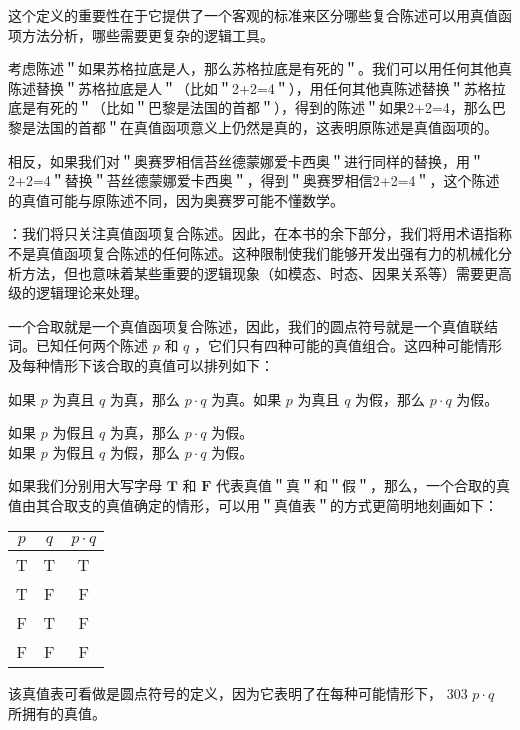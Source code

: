 这个定义的重要性在于它提供了一个客观的标准来区分哪些复合陈述可以用真值函项方法分析，哪些需要更复杂的逻辑工具。

\begin{examplebox}[title=真值函项性的检验方法]
考虑陈述＂如果苏格拉底是人，那么苏格拉底是有死的＂。我们可以用任何其他真陈述替换＂苏格拉底是人＂（比如＂2+2=4＂），用任何其他真陈述替换＂苏格拉底是有死的＂（比如＂巴黎是法国的首都＂），得到的陈述＂如果2+2=4，那么巴黎是法国的首都＂在真值函项意义上仍然是真的，这表明原陈述是真值函项的。

相反，如果我们对＂奥赛罗相信苔丝德蒙娜爱卡西奥＂进行同样的替换，用＂2+2=4＂替换＂苔丝德蒙娜爱卡西奥＂，得到＂奥赛罗相信2+2=4＂，这个陈述的真值可能与原陈述不同，因为奥赛罗可能不懂数学。
\end{examplebox}

：我们将只关注真值函项复合陈述。因此，在本书的余下部分，我们将用术语指称不是真值函项复合陈述的任何陈述。这种限制使我们能够开发出强有力的机械化分析方法，但也意味着某些重要的逻辑现象（如模态、时态、因果关系等）需要更高级的逻辑理论来处理。

一个合取就是一个真值函项复合陈述，因此，我们的圆点符号就是一个真值联结词。已知任何两个陈述 $p$ 和 $q$ ，它们只有四种可能的真值组合。这四种可能情形及每种情形下该合取的真值可以排列如下：

如果 $p$ 为真且 $q$ 为真，那么 $p \cdot q$ 为真。如果 $p$ 为真且 $q$ 为假，那么 $p \cdot q$ 为假。

如果 $p$ 为假且 $q$ 为真，那么 $p \cdot q$ 为假。\\
如果 $p$ 为假且 $q$ 为假，那么 $p \cdot q$ 为假。

如果我们分别用大写字母 $\mathbf{T}$ 和 $\mathbf{F}$ 代表真值＂真＂和＂假＂，那么，一个合取的真值由其合取支的真值确定的情形，可以用＂真值表＂的方式更简明地刻画如下：

\begin{center}
\begin{tabular}{|ccc|}
\hline
$p$ & $q$ & $p \cdot q$ \\
\hline
T & T & T \\
T & F & F \\
F & T & F \\
F & F & F \\
\hline
\end{tabular}
\end{center}

该真值表可看做是圆点符号的定义，因为它表明了在每种可能情形下， 303 $p \cdot q$ 所拥有的真值。

